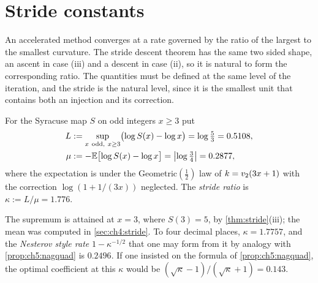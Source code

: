 \section{Stride constants}\label{sec:ch5:stride}

An accelerated method converges at a rate governed by the ratio of the
largest to the smallest curvature.  The stride descent theorem has the same
two sided shape, an ascent in case (iii) and a descent in case (ii), so it is
natural to form the corresponding ratio.  The quantities must be defined at
the same level of the iteration, and the stride is the natural level, since it
is the smallest unit that contains both an injection and its correction.

\begin{definition}\label{def:nesterov}
For the Syracuse map $S$ on odd integers $x\ge3$ put
\begin{align*}
  L&:=\sup_{x\ \mathrm{odd},\ x\ge3}\bigl(\log S(x)-\log x\bigr)=\log\tfrac53=0.5108,\\
  \mu&:=-\mathbb{E}\bigl[\log S(x)-\log x\bigr]=\bigl|\log\tfrac34\bigr|=0.2877,
\end{align*}
where the expectation is under the Geometric$(\tfrac12)$ law of
$k=v_2(3x+1)$ with the correction $\log(1+1/(3x))$ neglected.  The
\emph{stride ratio} is $\kappa:=L/\mu=1.776$.
\end{definition}

The supremum is attained at $x=3$, where $S(3)=5$, by \cref{thm:stride}(iii);
the mean was computed in \cref{sec:ch4:stride}.
To four decimal places, $\kappa=1.7757$, and the \emph{Nesterov style rate} $1-\kappa^{-1/2}$ that one may form from it by analogy with \cref{prop:ch5:nagquad} is $0.2496$.
If one insisted on the formula of
\cref{prop:ch5:nagquad}, the optimal coefficient at this $\kappa$ would be
$(\sqrt\kappa-1)/(\sqrt\kappa+1)=0.143$.

